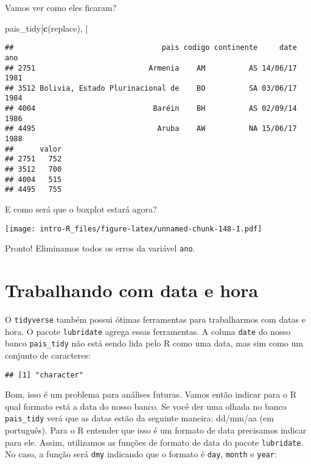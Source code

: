 \documentclass[]{book}
\newenvironment{Shaded}{\begin{snugshade}}{\end{snugshade}}
\newcommand{\KeywordTok}[1]{\textcolor[rgb]{0.13,0.29,0.53}{\textbf{#1}}}
\newcommand{\NormalTok}[1]{#1}
\newcommand{\OperatorTok}[1]{\textcolor[rgb]{0.81,0.36,0.00}{\textbf{#1}}}
\theoremstyle{definition}
\theoremstyle{definition}
\theoremstyle{definition}
\theoremstyle{remark}
\begin{document}
Vamos ver como eles ficaram?

\begin{Shaded}
\begin{Highlighting}[]
\NormalTok{pais_tidy[}\KeywordTok{c}\NormalTok{(replace), ]}
\end{Highlighting}
\end{Shaded}

\begin{verbatim}
##                                  pais codigo continente     date  ano
## 2751                          Armenia    AM          AS 14/06/17 1981
## 3512 Bolivia, Estado Plurinacional de    BO          SA 03/06/17 1984
## 4004                           Baréin    BH          AS 02/09/14 1986
## 4495                            Aruba    AW          NA 15/06/17 1988
##      valor
## 2751   752
## 3512   700
## 4004   515
## 4495   755
\end{verbatim}

E como será que o boxplot estará agora?

\texttt{[image: intro-R\_files/figure-latex/unnamed-chunk-148-1.pdf]}

Pronto! Eliminamos todos os erros da variável \texttt{ano}.

\hypertarget{trabalhando-com-data-e-hora}{%
\section{Trabalhando com data e hora}\label{trabalhando-com-data-e-hora}}

O \texttt{tidyverse} também possui ótimas ferramentas para trabalharmos com datas e hora. O pacote \texttt{lubridate} agrega essas ferramentas. A coluna \texttt{date} do nosso banco \texttt{pais\_tidy} não está sendo lida pelo R como uma data, mas sim como um conjunto de caracteres:

\begin{Shaded}
\end{Shaded}

\begin{verbatim}
## [1] "character"
\end{verbatim}

Bom, isso é um problema para análises futuras. Vamos então indicar para o R qual formato está a data do nosso banco. Se você der uma olhada no banco \texttt{pais\_tidy} verá que as datas estão da seguinte maneira: dd/mm/aa (em português). Para o R entender que isso é um formato de data precisamos indicar para ele. Assim, utilizamos as funções de formato de data do pacote \texttt{lubridate}. No caso, a função será \texttt{dmy} indicando que o formato é \texttt{day}, \texttt{month} e \texttt{year}:
\end{document}
